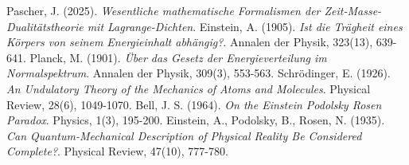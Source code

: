 \documentclass[12pt,a4paper]{article}
\begin{document}
	\begin{thebibliography}{99}
		 Pascher, J. (2025). \textit{Wesentliche mathematische Formalismen der Zeit-Masse-Dualitätstheorie mit Lagrange-Dichten}.
		 Einstein, A. (1905). \textit{Ist die Trägheit eines Körpers von seinem Energieinhalt abhängig?}. Annalen der Physik, 323(13), 639-641.
		 Planck, M. (1901). \textit{Über das Gesetz der Energieverteilung im Normalspektrum}. Annalen der Physik, 309(3), 553-563.
		 Schrödinger, E. (1926). \textit{An Undulatory Theory of the Mechanics of Atoms and Molecules}. Physical Review, 28(6), 1049-1070.
		 Bell, J. S. (1964). \textit{On the Einstein Podolsky Rosen Paradox}. Physics, 1(3), 195-200.
		 Einstein, A., Podolsky, B., Rosen, N. (1935). \textit{Can Quantum-Mechanical Description of Physical Reality Be Considered Complete?}. Physical Review, 47(10), 777-780.
	\end{thebibliography}
	
\end{document}
